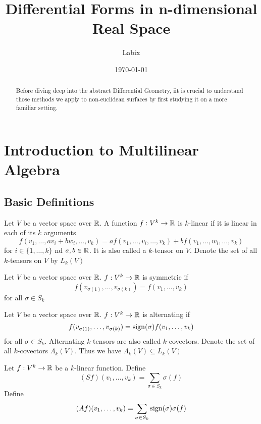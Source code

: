 \documentclass[a4paper]{article}
\title{Differential Forms in n-dimensional Real Space}
\author{Labix}
\date{\today}
\begin{document}
\maketitle
\begin{abstract} Before diving deep into the abstract Differential Geometry, iit is crucial to understand those methods we apply to non-euclidean surfaces by first studying it on a more familiar setting. 
\end{abstract}
\pagebreak
\tableofcontents
\pagebreak

\section{Introduction to Multilinear Algebra}
\subsection{Basic Definitions}
\begin{defn} Let $V$ be a vector space over $\mathbb{R}$. A function $f:V^k\to\mathbb{R}$ is $k$-linear if it is linear in each of its $k$ arguments $$f(v_1,\dots,av_i+bw_i,\dots,v_k)=af(v_1,\dots,v_i,\dots,v_k)+bf(v_1,\dots,w_i,\dots,v_k)$$ for $i\in\{1,\dots,k\}$ nd $a,b\in\mathbb{R}$. It is also called a $k$-tensor on $V$. Denote the set of all $k$-tensors on $V$ by $L_k(V)$
\end{defn}

\begin{defn}[Symmetric] Let $V$ be a vector space over $\mathbb{R}$. $f:V^k\to\mathbb{R}$ is symmetric if $$f(v_{\sigma(1)},\dots,v_{\sigma(k)})=f(v_1,\dots,v_k)$$ for all $\sigma\in S_k$
\end{defn}

\begin{defn}[Alternating] Let $V$ be a vector space over $\mathbb{R}$. $f:V^k\to\mathbb{R}$ is alternating if $$f(v_{\sigma(1)},\dots,v_{\sigma(k)})=\operatorname{sign}(\sigma)f(v_1,\dots,v_k)$$ for all $\sigma\in S_k$. Alternating $k$-tensors are also called $k$-covectors. Denote the set of all $k$-covectors $\Lambda_k(V)$. Thus we have $\Lambda_k(V)\subseteq L_k(V)$
\end{defn}

\begin{defn} Let $f:V^k\to\mathbb{R}$ be a $k$-linear function. Define $$(Sf)(v_1,\dots,v_k)=\sum_{\sigma\in S_k}\sigma(f)$$ Define $$(Af)(v_1,\dots,v_k)=\sum_{\sigma\in S_k}\operatorname{sign}(\sigma)\sigma(f)$$
\end{defn}
\end{document}
